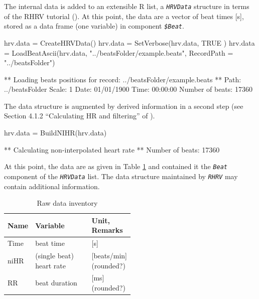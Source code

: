 \documentclass[a4paper, english, utf8]{amsart}
\makeatletter
\newcommand\code[1]{\textsl{\texttt{#1}}}
\newcommand\codex[1]{\textsl{\texttt{#1}}\index{#1@\texttt{#1}|textit}}
\makeatother
\begin{document}
The internal data is added to an extensible R list, a \codex{HRVData} structure in
terms of the RHRV tutorial (\cite{Garcia:2014aaTutorial}). At this point, the data
are a vector of  beat times [s], stored as a data frame (one variable) in component \code{\$Beat}.

\begin{Schunk}
\begin{Sinput}
  hrv.data  = CreateHRVData()
  hrv.data = SetVerbose(hrv.data, TRUE )
  hrv.data = LoadBeatAscii(hrv.data, "../beatsFolder/example.beats",
         RecordPath = "../beatsFolder")
\end{Sinput}
\begin{Soutput}
** Loading beats positions for record: ../beatsFolder/example.beats **
   Path: ../beatsFolder 
   Scale: 1 
   Date: 01/01/1900
   Time: 00:00:00
   Number of beats: 17360 
\end{Soutput}
\end{Schunk}

The data structure is augmented by derived information in a second step (see Section 4.1.2 ``Calculating HR and filtering'' of \cite{Garcia:2014aaTutorial}).
\begin{Schunk}
\begin{Sinput}
  hrv.data = BuildNIHR(hrv.data)
\end{Sinput}
\begin{Soutput}
** Calculating non-interpolated heart rate **
   Number of beats: 17360 
\end{Soutput}
\end{Schunk}

At this point, the data are as given in Table \ref{tab:inventory} and contained it the \code{Beat} component of the \code{HRVData} list. The data structure maintained by \code{RHRV} may contain additional information.

\begin{table}
\begin{center}
\begin{tabular}{|l|p{0.5\linewidth}|l|}
\hline
\rowcolor[gray]{0.8}%
Name&Variable&Unit, Remarks\\
\hline
Time&beat time&[s]\\
niHR&(single beat) heart rate&[beats/min] (rounded?)\\
RR&beat duration&[ms]  (rounded?)\\
\hline
\end{tabular}
\end{center}
\caption{Raw data inventory}\label{tab:inventory}
\end{table}
\end{document}

